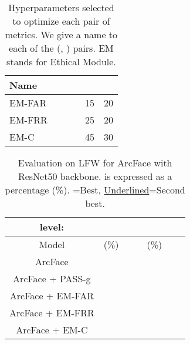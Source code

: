 \documentclass[nohyperref]{article}
\theoremstyle{plain}
\theoremstyle{definition}
\theoremstyle{remark}
\begin{document}
\begin{table}[h!]
\caption{Hyperparameters selected to optimize each pair of metrics. We give a name to each of the (, ) pairs. EM stands for Ethical Module.}\label{tab:kappa_choice}
\vskip 0.1in
\begin{center}
\begin{small}
\begin{sc}
\begin{tabular}{lccccr}
\toprule
Name &  &  &  &  &  \\
\midrule 
EM-FAR &  &  &  & 15 & 20\\
EM-FRR &  &  &  & 25 & 20\\
EM-C &  &  &  & 45 & 30\\
\bottomrule
\end{tabular}
\end{sc}
\end{small}
\end{center}
\vskip -0.2in
\end{table}




\begin{table*}[h!]
\caption{Evaluation on LFW for ArcFace with ResNet50 backbone.  is expressed as a percentage (\%). =Best, \underline{Underlined}=Second best.}
\vskip 0.1in
\begin{center}
\begin{small}
\begin{sc}
\begin{tabular}{ c | ccc | ccc}
  level:          & \multicolumn{3}{c}{ } & \multicolumn{3}{c}{ } \\ 
 \toprule
  Model     &  (\%)  &   &   &  (\%)  &         &         \\ \midrule 
                               ArcFace  &   &  &   &    &   &  \\ 
                ArcFace + PASS-g &  &  &  &  &  & \\
                               
   ArcFace + EM-FAR &   &  &   &  &  &   \\
                               ArcFace + EM-FRR &  &  &  &  &   &  \\
                               ArcFace + EM-C &   &  &  &  &   &   \\ \bottomrule
\end{tabular}
\end{sc}
\end{small}
\end{center}
\vskip -0.1in
\label{table:LFW_1vs1_models}
\end{table*}
\end{document}
